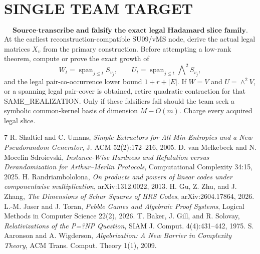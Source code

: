 \documentclass[11pt]{article}
\begin{document}
\section*{SINGLE TEAM TARGET}
\[
\boxed{\textbf{Source-transcribe and falsify the exact legal Hadamard slice family.}}
\]
At the earliest reconstruction-compatible SU09/vMS node, derive the actual legal matrices \(X_v\) from the primary construction. Before attempting a low-rank theorem, compute or prove the exact growth of
\[
W_t=\operatorname{span}_{j\le t}S_{v_j},\qquad
U_t=\operatorname{span}_{j\le t}\bigwedge\nolimits^2S_{v_j},
\]
and the legal pair-co-occurrence lower bound \(1+r+|E|\). If \(W=V\) and \(U=\wedge^2V\), or a spanning legal pair-cover is obtained, retire quadratic contraction for that SAME\_REALIZATION. Only if these falsifiers fail should the team seek a symbolic common-kernel basis of dimension \(M-O(m)\). Charge every acquired legal slice.

\begin{thebibliography}{7}
 R. Shaltiel and C. Umans, \emph{Simple Extractors for All Min-Entropies and a New Pseudorandom Generator}, J. ACM 52(2):172--216, 2005.
 D. van Melkebeek and N. Mocelin Sdroievski, \emph{Instance-Wise Hardness and Refutation versus Derandomization for Arthur--Merlin Protocols}, Computational Complexity 34:15, 2025.
 H. Randriambololona, \emph{On products and powers of linear codes under componentwise multiplication}, arXiv:1312.0022, 2013.
 H. Gu, Z. Zhu, and J. Zhang, \emph{The Dimensions of Schur Squares of HRS Codes}, arXiv:2604.17864, 2026.
 L.-M. Jaser and J. Toran, \emph{Pebble Games and Algebraic Proof Systems}, Logical Methods in Computer Science 22(2), 2026.
 T. Baker, J. Gill, and R. Solovay, \emph{Relativizations of the P=?NP Question}, SIAM J. Comput. 4(4):431--442, 1975.
 S. Aaronson and A. Wigderson, \emph{Algebrization: A New Barrier in Complexity Theory}, ACM Trans. Comput. Theory 1(1), 2009.
\end{thebibliography}
\end{document}
